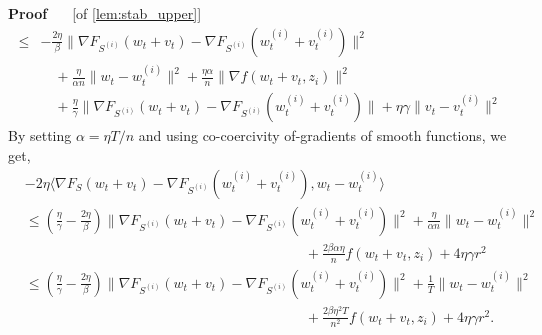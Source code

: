 \documentclass[11pt]{article}
\newcommand{\rad}{r}
\renewenvironment{proof}[1][]{%
  \par\noindent\textbf{\upshape Proof%
  \if\relax\detokenize{#1}\relax\else\ #1\fi}\ %
}{\jmlrQED}
\begin{document}
\begin{proof} [of \cref{lem:stab_upper}]
\begin{align*}
    \leq & - \frac{2\eta}{\beta} \|\nabla F_{S^{(i)}}(w_t + v_t) - \nabla F_{S^{(i)}}(w_t^{(i)}+v_t^{(i)})\|^2  \\&\quad +\frac{\eta }{\alpha n} \|w_t - w_t^{(i)}\|^2 + \frac{\eta \alpha }{n} \|\nabla f(w_t + v_t,z_i)\|^2\\
    &  \quad + \frac{\eta}{\gamma}\|\nabla F_{S^{(i)}}(w_t + v_t) - \nabla F_{S^{(i)}}(w_t^{(i)}+v_t^{(i)})\| + \eta\gamma \|v_t - v_t^{(i)}\|^2 
    \end{align*}
    By setting $\alpha=\eta T/n$ and using co-coercivity of-gradients of smooth functions, we get,
    \begin{align*}
    &-2\eta \langle \nabla F_{S}(w_t + v_t) - \nabla F_{S^{(i)}}(w_t^{(i)}+v_t^{(i)}), w_t - w_t^{(i)} \rangle 
     \\
     & \leq(\frac{\eta}{\gamma} - \frac{2\eta}{\beta})\|\nabla F_{S^{(i)}}(w_t + v_t) - \nabla F_{S^{(i)}}(w_t^{(i)}+v_t^{(i)})\|^2 +\frac{\eta }{\alpha n} \|w_t - w_t^{(i)}\|^2 \\
     & \hspace{20em} +\frac{2\beta \alpha \eta }{n} f(w_t+v_t,z_i)+4\eta \gamma \rad^2
    \\
     & \leq  (\frac{\eta}{\gamma} - \frac{2\eta}{\beta})\|\nabla F_{S^{(i)}}(w_t + v_t) - \nabla F_{S^{(i)}}(w_t^{(i)}+v_t^{(i)})\|^2 +\frac{1 }{T} \|w_t - w_t^{(i)}\|^2 \\
    & \hspace{20em} +\frac{2\beta \eta^2 T}{n^2} f(w_t+v_t,z_i)+4\eta \gamma \rad^2.
\end{align*}



\end{proof}
\end{document}
